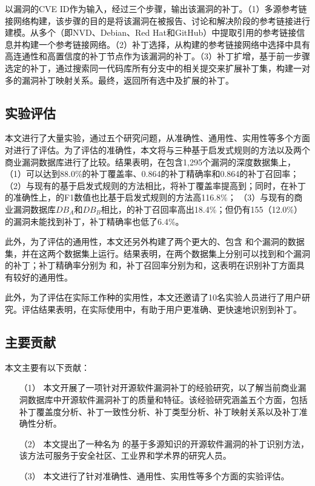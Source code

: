 \tool 以漏洞的CVE ID作为输入，经过三个步骤，输出该漏洞的补丁。（1）多源参考链接网络构建，该步骤的目的是将该漏洞在被报告、讨论和解决阶段的参考链接进行建模。\tool 从多个（即NVD、Debian、Red Hat和GitHub）中提取引用的参考链接信息并构建一个参考链接网络。（2）补丁选择，\tool 从构建的参考链接网络中选择中具有高连通性和高置信度的补丁节点作为该漏洞的补丁。（3）补丁扩增，基于前一步骤选定的补丁，\tool 通过搜索同一代码库所有分支中的相关提交来扩展补丁集，构建一对多的漏洞补丁映射关系。最终，返回所有选中及扩展的补丁。

\subsection{实验评估}
本文进行了大量实验，通过五个研究问题，从准确性、通用性、实用性等多个方面对\tool 进行了评估。为了评估\tool 的准确性，本文将\tool 与三种基于启发式规则的方法以及两个商业漏洞数据库进行了比较。结果表明，在包含1,295个漏洞的深度数据集上，
（1）\tool 可以达到88.0\%的补丁覆盖率、0.864的补丁精确率和0.864的补丁召回率；
（2）与现有的基于启发式规则的方法相比，\tool 将补丁覆盖率提高到；同时，在补丁的准确性上，\tool 的F1数值也比基于启发式规则的方法高116.8\%；
（3）与现有的商业漏洞数据库$DB_A$和$DB_B$相比，\tool 的补丁召回率高出18.4\%；但仍有155（12.0\%）的漏洞\tool 未能找到补丁，补丁精确率也低了6.4\%。%

此外，为了评估\tool 的通用性，本文还另外构建了两个更大的、包含 和个漏洞的数据集，并在这两个数据集上运行\tool 。结果表明，\tool 在两个数据集上分别可以找到和个漏洞的补丁；补丁精确率分别为 和，补丁召回率分别为和，这表明\tool 在识别补丁方面具有较好的通用性。

此外，为了评估\tool 在实际工作种的实用性，本文还邀请了10名实验人员进行了用户研究。评估结果表明，在实际使用中，\tool 有助于用户更准确、更快速地识别到补丁。

\subsection{主要贡献}
本文主要有以下贡献：
\begin{enumerate}
\item [（1）]本文开展了一项针对开源软件漏洞补丁的经验研究，以了解当前商业漏洞数据库中开源软件漏洞补丁的质量和特征。该经验研究涵盖五个方面，包括补丁覆盖度分析、补丁一致性分析、补丁类型分析、补丁映射关系以及补丁准确性分析。
\item [（2）]本文提出了一种名为 \tool 的基于多源知识的开源软件漏洞的补丁识别方法，该方法可服务于安全社区、工业界和学术界的研究人员。
\item [（3）]本文进行了针对\tool 准确性、通用性、实用性等多个方面的实验评估。
\end{enumerate}


